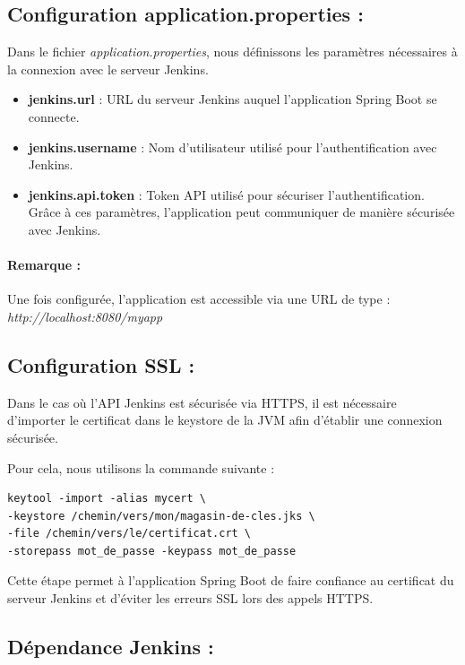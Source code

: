 \subsection*{Configuration application.properties :}

Dans le fichier \textit{application.properties}, nous définissons les paramètres nécessaires à la connexion avec le serveur Jenkins.

\begin{itemize}
    \item \textbf{jenkins.url} :  
    URL du serveur Jenkins auquel l’application Spring Boot se connecte.

    \item \textbf{jenkins.username} :  
    Nom d’utilisateur utilisé pour l’authentification avec Jenkins.

    \item \textbf{jenkins.api.token} :  
    Token API utilisé pour sécuriser l’authentification.  
    Grâce à ces paramètres, l’application peut communiquer de manière sécurisée avec Jenkins.

\end{itemize}

\paragraph{Remarque :}  
Une fois configurée, l’application est accessible via une URL de type :  
\textit{http://localhost:8080/myapp}
\subsection*{Configuration SSL :}

Dans le cas où l’API Jenkins est sécurisée via HTTPS, il est nécessaire d’importer le certificat dans le keystore de la JVM afin d’établir une connexion sécurisée.

Pour cela, nous utilisons la commande suivante :

\begin{verbatim}
keytool -import -alias mycert \
-keystore /chemin/vers/mon/magasin-de-cles.jks \
-file /chemin/vers/le/certificat.crt \
-storepass mot_de_passe -keypass mot_de_passe
\end{verbatim}

Cette étape permet à l’application Spring Boot de faire confiance au certificat du serveur Jenkins et d’éviter les erreurs SSL lors des appels HTTPS.

\subsection*{Dépendance Jenkins :}

